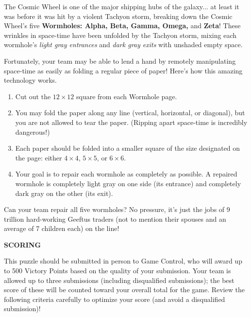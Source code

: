 The Cosmic Wheel is one of the major shipping hubs of the galaxy...
at least it was before it was hit by a violent Tachyon storm,
breaking down the Cosmic Wheel's five 
\textbf{Wormholes: Alpha, Beta, Gamma, Omega,} and \textbf{Zeta}! 
These wrinkles in space-time have been
unfolded by the Tachyon storm, mixing each wormhole's 
\textit{light gray entrances} and \textit{dark gray exits}
with unshaded empty space.

Fortunately, your team may be able to lend a hand
by remotely manipulating space-time as easily as folding
a regular piece of paper! Here's how this amazing technology
works.

\begin{enumerate}
  \item Cut out the \(12\times12\) square from each Wormhole page.
  \item You may fold the paper along any line (vertical, horizontal, or diagonal), 
  but you are not allowed to tear the paper.
  (Ripping apart space-time is incredibly dangerous!)
  \item Each paper should be folded into a smaller square of the size
  designated on the page: either
  \(4\times4\), \(5\times5\), or \(6\times6\). 
  \item Your goal is to repair each wormhole as completely as possible. 
  A repaired wormhole is completely light gray on one side (its entrance) 
  and completely dark gray on the other (its exit).
\end{enumerate}

Can your team repair all five wormholes?
No pressure, it's just the jobs of 9 trillion hard-working Geeftus traders
(not to mention their spouses and an average of 7 children each) on the line!

\textbf{SCORING}

This puzzle should be submitted in person to Game Control, who will award up to
500 Victory Points based on the quality of your submission.
Your team is allowed up to three submissions (including disqualified
submissions); the best score of these will be counted toward your overall
total for the game. Review the following criteria 
carefully to optimize your score (and avoid a disqualified submission)!

